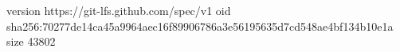 version https://git-lfs.github.com/spec/v1
oid sha256:70277de14ca45a9964aec16f89906786a3e56195635d7cd548ae4bf134b10e1a
size 43802
